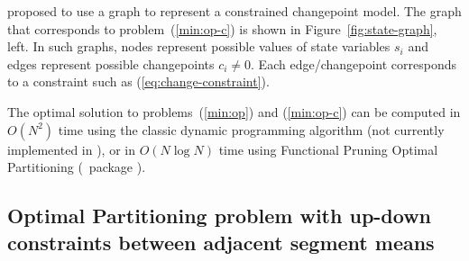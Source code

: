 \documentclass[article]{jss}
\newcommand{\R}{\proglang{R}}
\begin{document}
\citet{Hocking-constrained-changepoint-detection} proposed to use a
graph to represent a constrained changepoint model. The graph that
corresponds to problem~(\ref{min:op-c}) is shown in
Figure~\ref{fig:state-graph}, left. In such graphs, nodes represent
possible values of state variables $s_i$ and edges represent possible
changepoints $c_i\neq 0$. Each edge/changepoint corresponds to a
constraint such as (\ref{eq:change-constraint}).

The optimal solution to problems~(\ref{min:op}) and (\ref{min:op-c})
can be computed in $O(N^2)$ time using the classic dynamic programming
algorithm (not currently implemented in \R), or in $O(N\log N)$ time
using Functional Pruning Optimal Partitioning (\R\ package
).

\subsection{Optimal Partitioning problem with up-down constraints between
  adjacent segment means}
\end{document}
